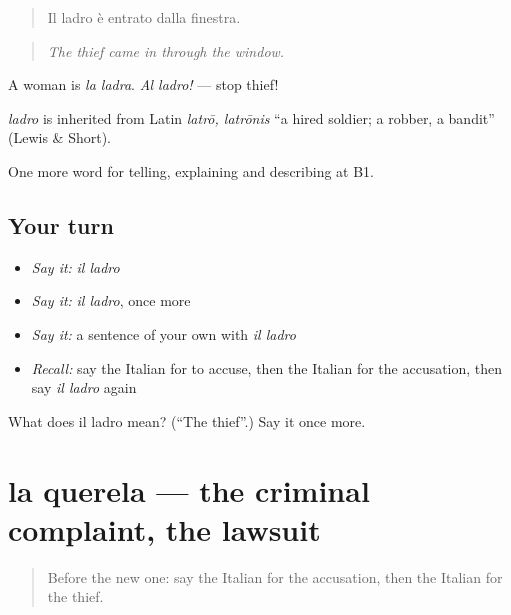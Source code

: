 \begin{quote}
Il ladro è entrato dalla finestra.
\end{quote}

\begin{quote}
\emph{The thief came in through the window.}
\end{quote}

A woman is \emph{la ladra}. \emph{Al ladro!} — stop thief!

\begin{cousinweb}
\emph{ladro} is inherited from Latin \emph{latrō, latrōnis} \textquotedblleft{}a hired soldier; a robber, a bandit\textquotedblright{} (Lewis \& Short).
\end{cousinweb}

\begin{grammarlens}[title={What you've built}]
One more word for telling, explaining and describing at B1.
\end{grammarlens}

\subsection*{Your turn}
\begin{itemize}
\raggedright
  \item \emph{Say it:} \emph{il ladro}
  \item \emph{Say it:} \emph{il ladro}, once more
  \item \emph{Say it:} a sentence of your own with \emph{il ladro}
  \item \emph{Recall:} say the Italian for to accuse, then the Italian for the accusation, then say \emph{il ladro} again
\end{itemize}

\begin{tcolorbox}[breakable,colback=teal!4,colframe=teal!35!black,title={Before you move on}]
What does il ladro mean? (\textquotedblleft{}The thief\textquotedblright{}.) Say it once more.
\end{tcolorbox}
\section[la querela]{la querela — the criminal complaint, the lawsuit}

\label{lesson:IT-C391-querela}



\begin{quote}
Before the new one: say the Italian for the accusation, then the Italian for the thief.
\end{quote}

